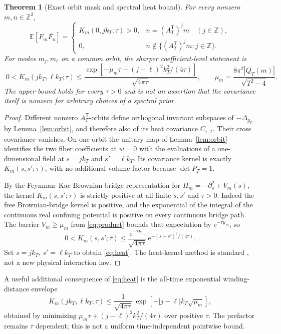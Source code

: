 \documentclass[11pt,a4paper]{article}
\newtheorem{theorem}{Theorem}
\newcommand{\Z}{\mathbb Z}
\newcommand{\e}{\mathrm e}
\begin{document}
\begin{theorem}[Exact orbit mask and spectral heat bound]
\label{thm:cov}
For every nonzero $m,n\in\Z^2$,
\begin{equation}\label{eq:mask}
\mathbb E[F_m\overline{F_n}]=
\begin{cases}
K_m(0,jk_T;\tau)>0,
 &n=(A_T^{\mathsf T})^j m\quad(j\in\Z),\\
0,&n\notin\{(A_T^{\mathsf T})^j m:j\in\Z\}.
\end{cases}
\end{equation}
For modes $m_j,m_\ell$ on a common orbit,
the sharper coefficient-level statement is
\begin{equation}\label{eq:heat}
\boxed{\;
0<K_m(jk_T,\ell k_T;\tau)
\le \frac{\exp[-\mu_m\tau
-(j-\ell)^2k_T^2/(4\tau)]}{\sqrt{4\pi\tau}},
\qquad
\mu_m=\frac{8\pi^2|Q_T(m)|}{\sqrt{T^2-4}}.
\;}
\end{equation}
The upper bound holds for every $\tau>0$ and
is not an assertion that the covariance itself
is nonzero for arbitrary choices of a spectral prior.
\end{theorem}
\begin{proof}
Different nonzero $A_T^{\mathsf T}$-orbits define orthogonal
invariant subspaces of $-\Delta_{g_T}$ by
Lemma~\ref{lem:orbit}, and therefore also of its heat
covariance $C_{\tau,T}$. Their cross covariance vanishes.
On one orbit the unitary map of Lemma~\ref{lem:orbit}
identifies the two fiber coefficients at $w=0$ with
the evaluations of a one-dimensional field at
$s=jk_T$ and $s'=\ell k_T$. Its covariance kernel
is exactly $K_m(s,s';\tau)$, with no additional
volume factor because $\det P_T=1$.

By the Feynman--Kac Brownian-bridge representation
for $H_m=-\partial_s^2+V_m(s)$, the kernel
$K_m(s,s';\tau)$ is strictly positive at all
finite $s,s'$ and $\tau>0$. Indeed the free
Brownian-bridge kernel is positive, and the
exponential of the integral of the continuous
real confining potential is positive on every
continuous bridge path. The barrier
$V_m\ge\mu_m$ from \eqref{eq:product} bounds
that expectation by $\e^{-\tau\mu_m}$,
so
\[
0<K_m(s,s';\tau)\le
\frac{\e^{-\tau\mu_m}}{\sqrt{4\pi\tau}}\,
\e^{-(s-s')^2/(4\tau)}.
\]
Set $s=jk_T$, $s'=\ell k_T$ to obtain
\eqref{eq:heat}. The heat-kernel method is
standard \cite{feynman}, not a new physical
interaction law.
\end{proof}

A useful additional consequence of \eqref{eq:heat}
is the all-time exponential winding-distance envelope
\[
K_m(jk_T,\ell k_T;\tau)\le
\frac{1}{\sqrt{4\pi\tau}}\,
\exp\!\left[-|j-\ell|k_T\sqrt{\mu_m}\right],
\]
obtained by minimizing
$\mu_m\tau+(j-\ell)^2k_T^2/(4\tau)$
over positive $\tau$. The prefactor remains
$\tau$ dependent; this is not a uniform
time-independent pointwise bound.
\end{document}
